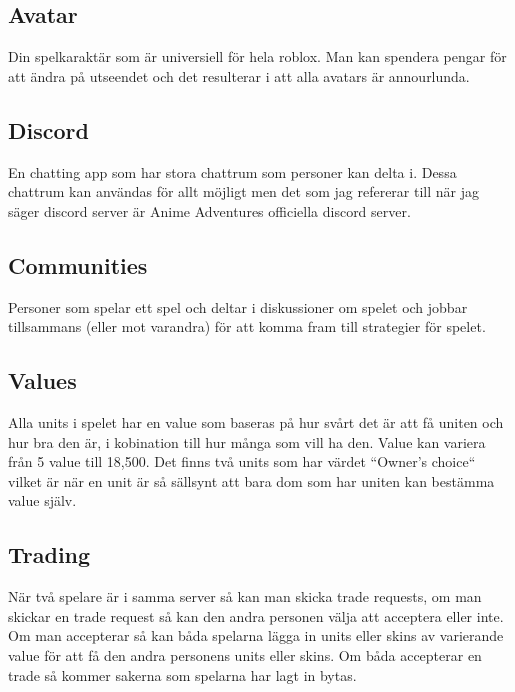 \documentclass[11p]{article}
\begin{document}
\subsection{Avatar} Din spelkaraktär som är universiell för hela roblox. Man kan spendera pengar för att ändra på utseendet och det resulterar i att alla avatars är annourlunda.
\subsection{Discord} En chatting app som har stora chattrum som personer kan delta i. Dessa chattrum kan användas för allt möjligt men det som jag refererar till när jag säger discord server är Anime Adventures officiella discord server.
\subsection{Communities} Personer som spelar ett spel och deltar i diskussioner om spelet och jobbar tillsammans (eller mot varandra) för att komma fram till strategier för spelet.
\subsection{Values} Alla units i spelet har en value som baseras på hur svårt det är att få uniten och hur bra den är, i kobination till hur många som vill ha den. Value kan variera från 5 value till 18,500. Det finns två units som har värdet ``Owner's choice`` vilket är när en unit är så sällsynt att bara dom som har uniten kan bestämma value själv.
\subsection{Trading} När två spelare är i samma server så kan man skicka trade requests, om man skickar en trade request så kan den andra personen välja att acceptera eller inte. Om man accepterar så kan båda spelarna lägga in units eller skins av varierande value för att få den andra personens units eller skins. Om båda accepterar en trade så kommer sakerna som spelarna har lagt in bytas.
\clearpage
\end{document}
